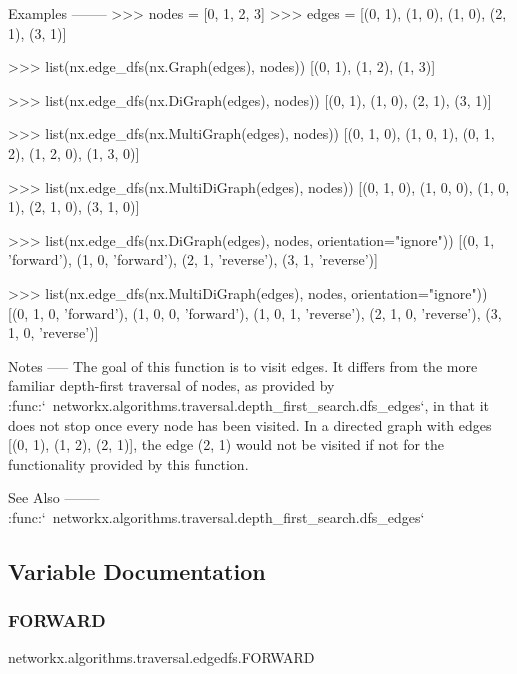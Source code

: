 \begin{DoxyVerb}
Examples
--------
>>> nodes = [0, 1, 2, 3]
>>> edges = [(0, 1), (1, 0), (1, 0), (2, 1), (3, 1)]

>>> list(nx.edge_dfs(nx.Graph(edges), nodes))
[(0, 1), (1, 2), (1, 3)]

>>> list(nx.edge_dfs(nx.DiGraph(edges), nodes))
[(0, 1), (1, 0), (2, 1), (3, 1)]

>>> list(nx.edge_dfs(nx.MultiGraph(edges), nodes))
[(0, 1, 0), (1, 0, 1), (0, 1, 2), (1, 2, 0), (1, 3, 0)]

>>> list(nx.edge_dfs(nx.MultiDiGraph(edges), nodes))
[(0, 1, 0), (1, 0, 0), (1, 0, 1), (2, 1, 0), (3, 1, 0)]

>>> list(nx.edge_dfs(nx.DiGraph(edges), nodes, orientation="ignore"))
[(0, 1, 'forward'), (1, 0, 'forward'), (2, 1, 'reverse'), (3, 1, 'reverse')]

>>> list(nx.edge_dfs(nx.MultiDiGraph(edges), nodes, orientation="ignore"))
[(0, 1, 0, 'forward'), (1, 0, 0, 'forward'), (1, 0, 1, 'reverse'), (2, 1, 0, 'reverse'), (3, 1, 0, 'reverse')]

Notes
-----
The goal of this function is to visit edges. It differs from the more
familiar depth-first traversal of nodes, as provided by
:func:`~networkx.algorithms.traversal.depth_first_search.dfs_edges`, in
that it does not stop once every node has been visited. In a directed graph
with edges [(0, 1), (1, 2), (2, 1)], the edge (2, 1) would not be visited
if not for the functionality provided by this function.

See Also
--------
:func:`~networkx.algorithms.traversal.depth_first_search.dfs_edges`\end{DoxyVerb}
 

\subsection{Variable Documentation}
\mbox{\label{namespacenetworkx_1_1algorithms_1_1traversal_1_1edgedfs_a9feb95c3f6751c18a8529dd6a7ec86c9}} 
\subsubsection{\texorpdfstring{F\+O\+R\+W\+A\+RD}{FORWARD}}
{\footnotesize\ttfamily networkx.\+algorithms.\+traversal.\+edgedfs.\+F\+O\+R\+W\+A\+RD}

